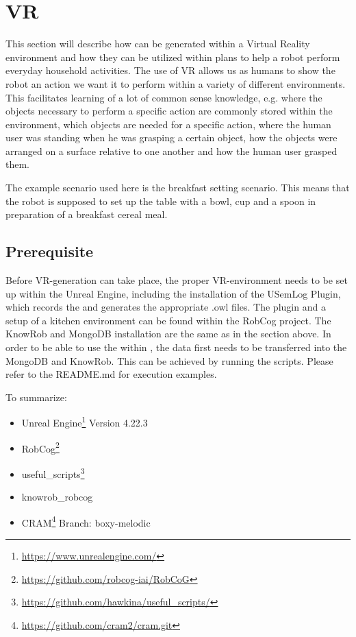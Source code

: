 \section{VR \neems}
\label{sec:vr-neem}
\lstset{style=lispcode}

This section will describe how \neems can be generated within a Virtual Reality environment and how they can be utilized within \cram plans to help a robot perform everyday household activities. The use of VR allows us as humans to show the robot an action we want it to perform within a variety of different environments. This facilitates learning of  a lot of common sense knowledge, e.g. where the objects necessary to perform a specific action are commonly stored within the environment, which objects are needed for a specific action, where the human user was standing when he was grasping a certain object, how the objects were arranged on a surface relative to one another and how the human user grasped them.  

The example scenario used here is the breakfast setting scenario. This means that the robot is supposed to set up the table with a bowl, cup and a spoon in preparation of a breakfast cereal meal. 

\subsection{Prerequisite}
Before VR-\neem generation can take place, the proper VR-environment needs to be set up within the Unreal Engine, including the installation of the USemLog Plugin, which records the \neems and generates the appropriate .owl files. The plugin and a setup of a kitchen environment can be found within the RobCog project. 
The KnowRob and MongoDB installation are the same as in the section above. 
In order to be able to use the \neems within \cram, the data first needs to be transferred into the MongoDB and KnowRob. This can be achieved by running the scripts. Please refer to the README.md for execution examples.

 
To summarize: 
\begin{itemize}
	\item Unreal Engine\footnote{\url{https://www.unrealengine.com/}} Version 4.22.3
	\item RobCog\footnote{\url{https://github.com/robcog-iai/RobCoG}}
	\item useful\_scripts\footnote{\url{https://github.com/hawkina/useful\_scripts/}} 
	\item knowrob\_robcog 
	\item CRAM\footnote{\url{https://github.com/cram2/cram.git}} Branch: boxy-melodic

\end{itemize}


